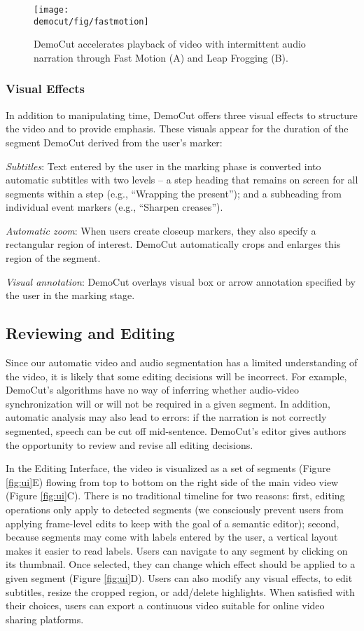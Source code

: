 \begin{figure}[b]
  \centering
\texttt{[image: \\democut/fig/fastmotion]}
  \caption{DemoCut accelerates playback of video with intermittent audio narration through Fast Motion (A) and Leap Frogging (B).}
  \label{fig:fastmotion}
\end{figure}

\subsubsection{Visual Effects}
In addition to manipulating time, DemoCut offers three visual effects to structure the video and to provide emphasis. These visuals appear for the duration of the segment DemoCut derived from the user's marker:

{\em Subtitles}: Text entered by the user in the marking phase is converted into automatic subtitles with two levels -- a step heading that remains on screen for all segments within a step (e.g., ``Wrapping the present''); and a subheading from individual event markers (e.g., ``Sharpen creases'').

{\em Automatic zoom}: When users create closeup markers, they also specify a rectangular region of interest. DemoCut automatically crops and enlarges this region of the segment.

{\em Visual annotation}: DemoCut overlays visual box or arrow annotation specified by the user in the marking stage.

\subsection{Reviewing and Editing}
Since our automatic video and audio segmentation has a limited understanding of the video, it is likely that some editing decisions will be incorrect. For example, DemoCut's algorithms have no way of inferring whether audio-video synchronization will or will not be required in a given segment. In addition, automatic analysis may also lead to errors: if the narration is not correctly segmented, speech can be cut off mid-sentence. DemoCut's editor gives authors the opportunity to review and revise all editing decisions.

In the Editing Interface, the video is visualized as a set of segments (Figure \ref{fig:ui}E) flowing from top to bottom on the right side of the main video view (Figure \ref{fig:ui}C). There is no traditional timeline for two reasons: first, editing operations only apply to detected segments (we consciously prevent users from applying frame-level edits to keep with the goal of a semantic editor); second, because segments may come with labels entered by the user, a vertical layout makes it easier to read labels. Users can navigate to any segment by clicking on its thumbnail. Once selected, they can change which effect should be applied to a given segment (Figure \ref{fig:ui}D). Users can also modify any visual effects, to edit subtitles, resize the cropped region, or add/delete highlights. When satisfied with their choices, users can export a continuous video suitable for online video sharing platforms.

